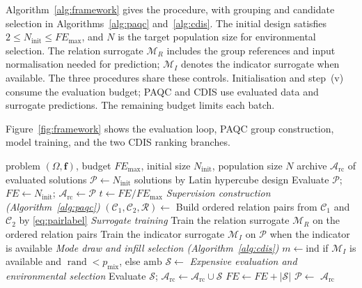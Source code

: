 \documentclass[final,5p,times,twocolumn]{elsarticle}
\newcommand{\vf}{\mathbf{f}}
\begin{document}
Algorithm~\ref{alg:framework} gives the procedure, with grouping and candidate
selection in Algorithms~\ref{alg:paqc} and~\ref{alg:cdis}.
The initial design satisfies $2\leq N_{\mathrm{init}}\leq FE_{\max}$, and $N$
is the target population size for environmental selection. The relation
surrogate $\mathcal{M}_R$ includes the group references and input normalisation
needed for prediction; $\mathcal{M}_I$ denotes the indicator surrogate when
available. The three procedures share these controls. Initialisation and
step~(v) consume the evaluation budget; PAQC and CDIS use evaluated data and
surrogate predictions. The remaining budget limits each batch.

Figure~\ref{fig:framework} shows the evaluation loop, PAQC group construction,
model training, and the two CDIS ranking branches.


\begin{algorithm}[t]
\caption{PACDIS}
\label{alg:framework}
\begin{algorithmic}[1]
\Require problem $(\Omega,\vf)$, budget $FE_{\max}$, initial size
         $N_{\mathrm{init}}$, population size $N$
\Ensure archive $\mathcal{A}_{\mathrm{rc}}$ of evaluated solutions
\State $\mathcal{P}\gets N_{\mathrm{init}}$ solutions by Latin hypercube design
\State Evaluate $\mathcal{P}$; $FE\gets N_{\mathrm{init}}$;
       $\mathcal{A}_{\mathrm{rc}}\gets\mathcal{P}$
  \State $t\gets FE/FE_{\max}$
  \Statex \hspace{\algorithmicindent}\textit{Supervision construction (Algorithm~\ref{alg:paqc})}
  \State $(\mathcal{C}_1,\mathcal{C}_2,\mathcal{R})\gets$ 
  \State Build ordered relation pairs from $\mathcal{C}_1$ and $\mathcal{C}_2$ by
         \eqref{eq:pairlabel}
  \Statex \hspace{\algorithmicindent}\textit{Surrogate training}
  \State Train the relation surrogate $\mathcal{M}_R$ on the ordered relation pairs
  \State Train the indicator surrogate $\mathcal{M}_I$ on $\mathcal{P}$ when the indicator is available
  \Statex \hspace{\algorithmicindent}\textit{Mode draw and infill selection (Algorithm~\ref{alg:cdis})}
  \State $m\gets\mathrm{ind}$ if $\mathcal{M}_I$ is available and
         $\operatorname{rand}<p_{\mathrm{mix}}$, else $\mathrm{amb}$
  \State $\mathcal{S}\gets$ 
  \Statex \hspace{\algorithmicindent}\textit{Expensive evaluation and environmental selection}
  \State Evaluate $\mathcal{S}$; $\mathcal{A}_{\mathrm{rc}}\gets\mathcal{A}_{\mathrm{rc}}\cup\mathcal{S}$
  \State $FE\gets FE+|\mathcal{S}|$
  \State $\mathcal{P}\gets$ 
\EndWhile
\State \Return $\mathcal{A}_{\mathrm{rc}}$
\end{algorithmic}
\end{algorithm}
\end{document}
